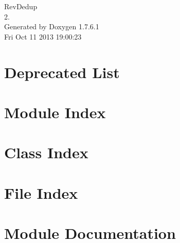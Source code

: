 \documentclass[a4paper]{book}
\begin{document}
\hypersetup{pageanchor=false,citecolor=blue}
\begin{titlepage}
\vspace*{7cm}
\begin{center}
{\Large \-Rev\-Dedup \\[1ex]\large 2. }\\
\vspace*{1cm}
{\large \-Generated by Doxygen 1.7.6.1}\\
\vspace*{0.5cm}
{\small Fri Oct 11 2013 19:00:23}\\
\end{center}
\end{titlepage}
\clearemptydoublepage
{}
\tableofcontents
\clearemptydoublepage
{}
\hypersetup{pageanchor=true,citecolor=blue}
\chapter{\-Deprecated \-List}
\label{deprecated}
\hypertarget{deprecated}{}

\chapter{\-Module \-Index}

\chapter{\-Class \-Index}

\chapter{\-File \-Index}

\chapter{\-Module \-Documentation}











\end{document}
